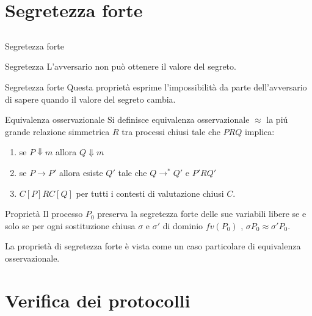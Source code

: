 \documentclass[11pt,xcolor=table]{beamer}
\begin{document}
\section{Segretezza forte}
\subsection{}
\begin{frame}{Segretezza forte}
    \begin{block}{Segretezza}
        L'avversario non può ottenere il valore del segreto.
    \end{block}
    \vspace{5mm}
    \begin{block}{Segretezza forte}
        Questa proprietà esprime l'impossibilità da parte dell'avversario di sapere quando il valore del segreto cambia.
    \end{block}
\end{frame}

\begin{frame}{Equivalenza osservazionale}
    Si definisce equivalenza osservazionale $\approx$ la piú grande relazione simmetrica $R$ tra processi chiusi tale che $PRQ$ implica:\\
    \begin{enumerate}
        \item se $P \Downarrow m$ allora $Q \Downarrow m$
        \item se $P \rightarrow P'$ allora esiste $Q'$ tale che $Q \rightarrow^* Q'$ e $P'RQ'$
        \item $C[P]RC[Q]$ per tutti i contesti di valutazione chiusi $C$.
    \end{enumerate}
\end{frame}

\begin{frame}{}
    \begin{block}{Proprietà}
        Il processo $P_0$ preserva la segretezza forte delle sue variabili libere se e solo se per ogni sostituzione chiusa $\sigma$ e $\sigma'$ di dominio $fv(P_0)$ , $\sigma P_0 \approx \sigma' P_0$.
    \end{block}
    
    \begin{block}{}
        La proprietà di segretezza forte è vista come un caso particolare di equivalenza osservazionale.
    \end{block}
\end{frame}


\section{Verifica dei protocolli}
\end{document}
